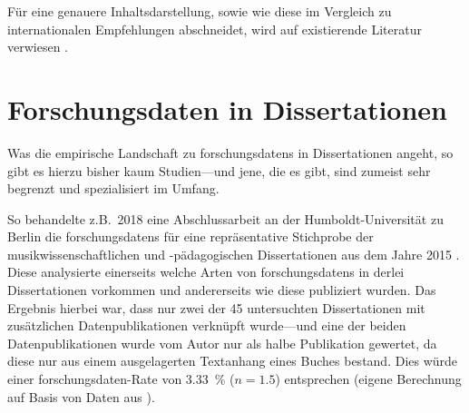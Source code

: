 Für eine genauere Inhaltsdarstellung, sowie wie diese im Vergleich zu internationalen Empfehlungen abschneidet, wird auf existierende Literatur verwiesen \autocite{Hiemenz2018-fdm-report}.

\section{Forschungsdaten in Dissertationen}\label{sec:forschungsstand-diss}
Was die empirische Landschaft zu \glspl{forschungsdaten} in Dissertationen angeht, so gibt es hierzu bisher kaum Studien---und jene, die es gibt, sind zumeist sehr begrenzt und spezialisiert im Umfang.

So behandelte z.B.~2018 eine Abschlussarbeit an der Humboldt-Universität zu Berlin die \glspl{forschungsdaten} für eine repräsentative Stichprobe der musikwissenschaftlichen und -pädagogischen Dissertationen aus dem Jahre 2015 \autocite{Wünsche2018Forschungsdaten}.
Diese analysierte einerseits welche Arten von \glspl{forschungsdaten} in derlei Dissertationen vorkommen und andererseits wie diese publiziert wurden.
Das Ergebnis hierbei war, dass nur zwei der \num{45} untersuchten Dissertationen mit zusätzlichen Datenpublikationen verknüpft wurde---und eine der beiden Datenpublikationen wurde vom Autor nur als halbe Publikation gewertet, da diese nur aus einem ausgelagerten Textanhang eines Buches bestand.
Dies würde einer \gls{forschungsdaten}-Rate von \SI{3.33}{\percent} ($n=\num{1.5}$) entsprechen (eigene Berechnung auf Basis von Daten aus \autocite{Wünsche2018Forschungsdaten}).

